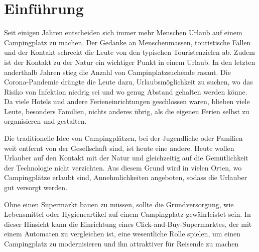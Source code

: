 \section{Einführung}



Seit einigen Jahren entscheiden sich immer mehr Menschen Urlaub auf einem Campingplatz zu machen. 
Der Gedanke an Menschenmassen, touristische Fallen und der Kontakt schreckt die Leute von den typischen
Touristenzielen ab. Zudem ist der Kontakt zu der Natur ein wichtiger Punkt in einem Urlaub. 
In den letzten anderthalb Jahren stieg die Anzahl von Campinplatzsuchende rasant. 
Die Corona-Pandemie drängte die Leute dazu, Urlaubsmöglichkeit zu suchen, wo das
Risiko von Infektion niedrig sei und wo genug Abstand gehalten werden könne. Da viele Hotels
und andere Ferieneinrichtungen geschlossen waren, blieben viele Leute, besonders Familien, nichts anderes 
übrig, als die eigenen Ferien selbst zu organisieren und gestalten.

Die traditionelle Idee von Campingplätzen, bei der Jugendliche oder Familien weit entfernt von der
Gesellschaft sind, ist heute eine andere. Heute wollen Urlauber auf den Kontakt mit 
der Natur und gleichzeitig auf die Gemütlichkeit der Technologie nicht verzichten. Aus diesem
Grund wird in vielen Orten, wo Campingplätze erlaubt sind, Annehmlichkeiten angeboten, sodass 
die Urlauber gut versorgt werden.

Ohne einen Supermarkt bauen zu müssen, sollte die Grundversorgung, wie Lebensmittel oder Hygieneartikel
auf einem Campingplatz gewährleistet sein. In dieser Hinsicht kann die Einrichtung eines Click-and-Buy-Supermarktes,
der mit einem Automaten zu vergleichen ist, eine wesentliche Rolle spielen, um einen Campingplatz zu modernisieren
 und ihn attraktiver für Reisende zu machen

